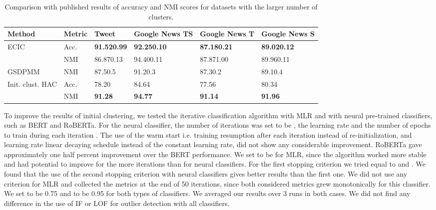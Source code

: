 \documentclass[11pt,a4paper]{article}
\begin{document}
\begin{table*}
\centering
\begin{tabular}{llllll}
\hline
\textbf{Method} &  \textbf{Metric} & \textbf{Tweet} & \textbf{Google News TS} & \textbf{Google News T} & \textbf{Google News S} \\
\hline
\multirow{2}{4em}{ECIC} & Acc. & \textbf{91.520.99} & \textbf{92.250.10} & \textbf{87.180.21} & \textbf{89.020.12} \\
& NMI &  86.870.13 & 94.400.11 & 87.871.00 & 89.960.11 \\
\hline
GSDPMM & NMI & 87.50.5 & 91.20.3 & 87.30.2 & 89.10.4 \\
\hline
\multirow{2}{4em}{Init. clust. HAC} & Acc. & 78.20 & 84.64 & 77.56 & 80.34 \\
& NMI & \textbf{91.28} & \textbf{94.77} & \textbf{91.14} & \textbf{91.96} \\
\hline
\end{tabular}
\caption{Comparison with published results of accuracy and NMI scores for datasets with the larger number of clusters.} 
\label{sota2}
\end{table*}

To improve the results of initial clustering, we tested the iterative classification algorithm with MLR and with neural pre-trained classifiers, such as BERT and RoBERTa. For the neural classifier, the number of iterations  was set to be , the learning rate  and the number of epochs to train during each iteration . The use of the warm start i.e. training resumption after each iteration instead of re-initialization, and learning rate linear decaying schedule instead of the constant learning rate, did not show any considerable improvement. RoBERTa gave approximately one half percent improvement over the BERT performance. We set  to be  for MLR, since the algorithm worked more stable and had potential to improve for the more iterations than for neural classifiers. For the first stopping criterion we tried  equal to  and . We found that the use of the second stopping criterion with neural classifiers gives better results than the first one. We did not use any criterion for MLR  and collected the metrics at the end of 50 iterations, since both considered metrics grew monotonically for this classifier. We set  to be 0.75 and  to be 0.95 for both types of classifiers. We averaged our results over 3 runs in both cases. We did not find any difference in the use of IF or LOF for outlier detection with all classifiers. 
\end{document}
